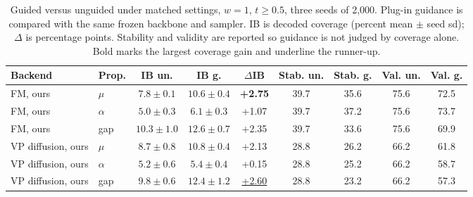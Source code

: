 \documentclass{article}
\begin{document}
\begin{table}[!htbp]
\centering\small\setlength{\tabcolsep}{4pt}
\caption{Guided versus unguided under matched settings, $w=1$, $t\ge0.5$, three seeds of 2,000. Plug-in guidance is compared with the same frozen backbone and sampler. IB is decoded coverage (percent mean $\pm$ seed sd); $\Delta$ is percentage points. Stability and validity are reported so guidance is not judged by coverage alone. Bold marks the largest coverage gain and underline the runner-up.}
\label{tab:guidance}
\begin{tabular}{llccccccc}
\toprule
Backend & Prop. & IB un. & IB g. & $\Delta$IB & Stab. un. & Stab. g. & Val. un. & Val. g.\\
\midrule
FM, ours & $\mu$ & $7.8\pm0.1$ & $10.6\pm0.4$ & \textbf{+2.75}& 39.7 & 35.6 & 75.6 & 72.5\\
FM, ours & $\alpha$ & $5.0\pm0.3$ & $6.1\pm0.3$ & +1.07 & 39.7 & 37.2 & 75.6 & 73.7\\
FM, ours & gap & $10.3\pm1.0$ & $12.6\pm0.7$ & +2.35 & 39.7 & 33.6 & 75.6 & 69.9\\
\midrule
VP diffusion, ours & $\mu$ & $8.7\pm0.8$ & $10.8\pm0.4$ & +2.13 & 28.8 & 26.2 & 66.2 & 61.8\\
VP diffusion, ours & $\alpha$ & $5.2\pm0.6$ & $5.4\pm0.4$ & +0.15 & 28.8 & 25.2 & 66.2 & 58.7\\
VP diffusion, ours & gap & $9.8\pm0.6$ & $12.4\pm1.2$ & \underline{+2.60}& 28.8 & 23.2 & 66.2 & 57.3\\
\bottomrule
\end{tabular}
\end{table}
\end{document}

